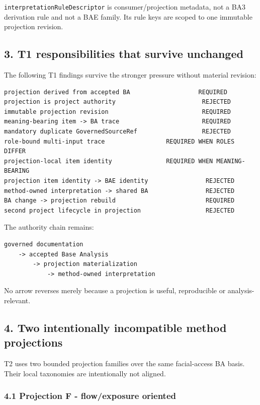 \documentclass[11pt,a4paper]{article}
\begin{document}
\texttt{interpretationRuleDescriptor} is consumer/projection metadata,
not a BA3 derivation rule and not a BAE family. Its rule keys are scoped
to one immutable projection revision.

\subsection{3. T1 responsibilities that survive
unchanged}\label{3-t1-responsibilities-that-survive-unchanged}

The following T1 findings survive the stronger pressure without material
revision:

\begin{verbatim}
projection derived from accepted BA                   REQUIRED
projection is project authority                        REJECTED
immutable projection revision                          REQUIRED
meaning-bearing item -> BA trace                       REQUIRED
mandatory duplicate GovernedSourceRef                  REJECTED
role-bound multi-input trace                 REQUIRED WHEN ROLES DIFFER
projection-local item identity               REQUIRED WHEN MEANING-BEARING
projection item identity -> BAE identity                REJECTED
method-owned interpretation -> shared BA                REJECTED
BA change -> projection rebuild                         REQUIRED
second project lifecycle in projection                  REJECTED
\end{verbatim}

The authority chain remains:

\begin{verbatim}
governed documentation
    -> accepted Base Analysis
        -> projection materialization
            -> method-owned interpretation
\end{verbatim}

No arrow reverses merely because a projection is useful, reproducible or
analysis-relevant.

\subsection{4. Two intentionally incompatible method
projections}\label{4-two-intentionally-incompatible-method-projections}

T2 uses two bounded projection families over the same facial-access BA
basis. Their local taxonomies are intentionally not aligned.

\subsubsection{4.1 Projection F - flow/exposure
oriented}\label{41-projection-f---flowexposure-oriented}
\end{document}
